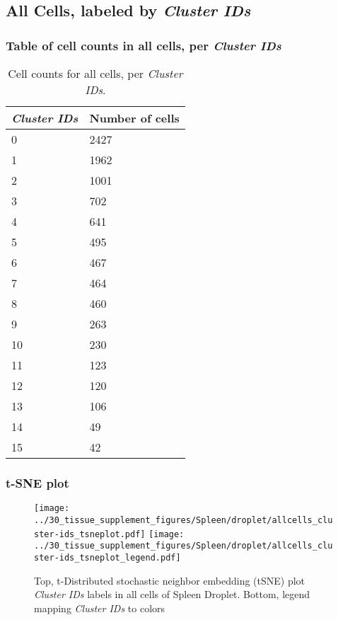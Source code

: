 \clearpage

\subsection{All Cells, labeled by \emph{Cluster IDs}}
\subsubsection{Table of cell counts in all cells, per \emph{Cluster IDs}}\begin{table}[h]
\centering
\label{my-label}
\begin{tabular}{@{}ll@{}}
\toprule

\emph{Cluster IDs}& Number of cells \\ \midrule
0 & 2427 \\

1 & 1962 \\

2 & 1001 \\

3 & 702 \\

4 & 641 \\

5 & 495 \\

6 & 467 \\

7 & 464 \\

8 & 460 \\

9 & 263 \\

10 & 230 \\

11 & 123 \\

12 & 120 \\

13 & 106 \\

14 & 49 \\

15 & 42 \\
\bottomrule
\end{tabular}
\caption{Cell counts for all cells, per \emph{Cluster IDs}.}
\end{table}

\clearpage
\subsubsection{t-SNE plot}
\begin{figure}[h]
\centering
\texttt{[image: ../30\_tissue\_supplement\_figures/Spleen/droplet/allcells\_cluster-ids\_tsneplot.pdf]}
\texttt{[image: ../30\_tissue\_supplement\_figures/Spleen/droplet/allcells\_cluster-ids\_tsneplot\_legend.pdf]}
\caption{Top, t-Distributed stochastic neighbor embedding (tSNE) plot  \emph{Cluster IDs} labels in all cells of Spleen Droplet. Bottom, legend mapping \emph{Cluster IDs} to colors}
\end{figure}


